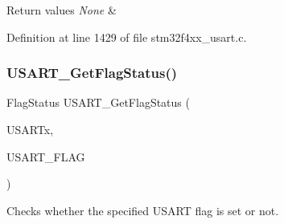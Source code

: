 \begin{DoxyRetVals}{Return values}
{\em None} & \\
\hline
\end{DoxyRetVals}


Definition at line 1429 of file stm32f4xx\+\_\+usart.\+c.

\mbox{\label{group___u_s_a_r_t___group9_ga144630722defc9e312f0ad280b68e9da}} 
\subsubsection{\texorpdfstring{U\+S\+A\+R\+T\+\_\+\+Get\+Flag\+Status()}{USART\_GetFlagStatus()}}
{\footnotesize\ttfamily Flag\+Status U\+S\+A\+R\+T\+\_\+\+Get\+Flag\+Status (\begin{DoxyParamCaption}\item[{\hyperlink{struct_u_s_a_r_t___type_def}{U\+S\+A\+R\+T\+\_\+\+Type\+Def} $\ast$}]{U\+S\+A\+R\+Tx,  }\item[{uint16\+\_\+t}]{U\+S\+A\+R\+T\+\_\+\+F\+L\+AG }\end{DoxyParamCaption})}



Checks whether the specified U\+S\+A\+RT flag is set or not. 


